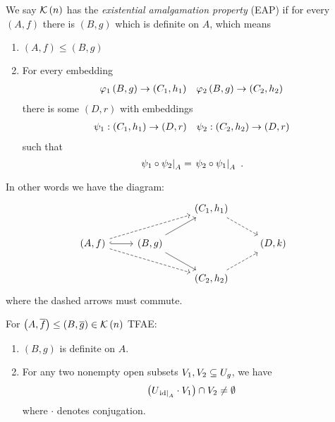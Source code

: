 \documentclass{amsart}
\begin{document}
\begin{defn}
We say $\mathcal{K}\left(n\right)$ has the \emph{existential amalgamation property} (EAP) if for every
$\left(A , f\right)$ there is $\left(B , g\right)$ which is definite on $A$, which means 
\begin{enumerate}[label = (\iii)]
\item $\left( A , f\right) \leq \left(B , g\right)$
\item For every embedding 
\begin{align}
\varphi_1\left(B , g\right) \rightarrow \left(C_1 , h_1\right)
&& \varphi_2\left(B , g\right) \rightarrow \left(C_2 , h_2\right)
\end{align}
there is some $\left(D , r\right)$ with embeddings 
\begin{align}
\psi_1 : \left(C_1 , h_1\right)\rightarrow \left(D , r\right)&&
\psi_2 : \left(C_2 , h_2\right)\rightarrow \left(D , r\right)
\end{align}
such that
\begin{equation}
\left.\psi_1\circ \psi_2 \right\vert_{A} = \left.\psi_2 \circ \psi_1 \right\vert_{A} \ .
\end{equation}
\end{enumerate}
In other words we have the diagram:
\begin{equation}
\begin{tikzcd}
&& \left(C_1 , h_1\right)\arrow[dashed]{dr}\\
\left(A , f\right)\arrow[dashed]{urr}\arrow[dashed]{drr}\arrow[hook]{r} &
\left(B , g\right)\arrow{ur}\arrow{dr}&&
\left(D , k\right)
\\
&& 
\left(C_2 , h_2\right)
\arrow[dashed]{ur}
\end{tikzcd}
\end{equation}
where the dashed arrows must commute. 
\end{defn}

\begin{prop}
For $\left(A , \overline{f}\right)\leq \left(B , \overline{g}\right)\in \mathcal{K}\left(n\right)$
TFAE:
\begin{enumerate}[label = (\iii)]
\item $\left(B , g\right)$ is definite on $A$.
\item For any two nonempty open subsets $V_1, V_2 \subseteq U_g$, we have
\begin{equation}
\left(U_{\left.\operatorname{id} \right\vert_{A}} \cdot V_1\right) \cap V_2 \neq \emptyset
\end{equation}
where $\cdot$ denotes conjugation.
\end{enumerate}
\end{prop}
\end{document}
